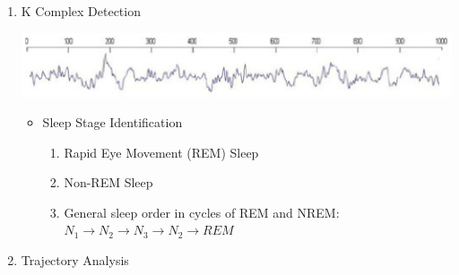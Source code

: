 \documentclass{tikzposter} %
\begin{document}
\begin{columns}
{\begin{itemize}
\begin{enumerate}
\begin{itemize}
  \end{itemize}

    \item
    K Complex Detection

    \begin{minipage}{0.3\linewidth}
 	 	\begin{tikzfigure}
			\includegraphics[scale=1.2]{figures//theme1//kcd.eps}
		 \end{tikzfigure}
	\end{minipage}

        \begin{itemize}

        \item
        Sleep Stage Identification

        \begin{enumerate}
          \item Rapid Eye Movement (REM) Sleep
          \item {Non-REM Sleep}
          \item General sleep order in cycles of REM and NREM:\\
                    $N_1 \rightarrow N_2
                    \rightarrow N_3 \rightarrow N_2
                    \rightarrow REM$
        \end{enumerate}

        \end{itemize}

    \item
    Trajectory Analysis
\end{enumerate}    
\end{itemize}
}






\end{columns}
\end{document}
